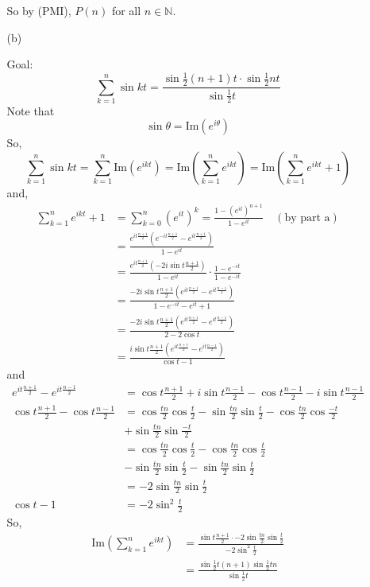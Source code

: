 \documentclass[12pt]{amsart}
\theoremstyle{definition}
\theoremstyle{remark}
\begin{document}
\begin{itemize}
\begin{itemize}
So by (PMI), $P(n)$ for all $n\in \mathbb{N}$.

\vspace{0.1 cm}
\item[(b)] 

Goal: $$\sum_{k=1}^{n}\sin kt=\frac{\sin \frac{1}{2}(n+1)t\cdot\sin\frac{1}{2}nt} {\sin \frac{1}{2}t}$$
Note that
$$\sin \theta=\text{Im}(e^{i\theta})$$
So, $$\sum_{k=1}^{n}\sin kt=\sum_{k=1}^{n}\text{Im}(e^{ikt})=\text{Im}\left(\sum_{k=1}^{n}e^{ikt}\right)=\text{Im}\left(\sum_{k=1}^{n}e^{ikt}+1\right)$$
and, \begin{align*}\sum_{k=1}^{n}e^{ikt}+1&=\sum_{k=0}^{n}(e^{it})^{k}= \frac{1-(e^{it})^{n+1}}{1-e^{it}}\quad(\text{by part a})\\
&=\frac{e^{it\frac{n+1}{2}}\left(e^{-it\frac{n+1}{2}}-e^{it\frac{n+1}{2}}\right)}{1-e^{it}}\\
&= \frac{e^{it\frac{n+1}{2}}\left(-2i\sin t\frac{n+1}{2}\right)}{1-e^{it}}\cdot \frac{1-e^{-it}}{1-e^{-it}}\\
&= \frac{-2i\sin t\frac{n+1}{2}(e^{it\frac{n+1}{2}}-e^{it\frac{n-1}{2}})}{1-e^{-it}-e^{it}+1}\\
&= \frac{-2i\sin t\frac{n+1}{2}(e^{it\frac{n+1}{2}}-e^{it\frac{n-1}{2}})}{2-2\cos t}\\
&= \frac{i\sin t\frac{n+1}{2}\left(e^{it\frac{n+1}{2}}-e^{it\frac{n-1}{2}}\right)}{\cos t-1}
\end{align*}
and \begin{align*}
e^{it\frac{n+1}{2}}-e^{it\frac{n-1}{2}}&= \cos t\frac{n+1}{2}+i\sin t\frac{n-1}{2}-\cos t\frac{n-1}{2}-i\sin t\frac{n-1}{2}\\
\cos t\frac{n+1}{2}-\cos t\frac{n-1}{2}&= \cos \frac{tn}{2}\cos \frac{t}{2}-\sin \frac{tn}{2}\sin \frac{t}{2}-\cos \frac{tn}{2}\cos \frac{-t}{2}\\&+\sin \frac{tn}{2}\sin \frac{-t}{2}\\
&= \cos \frac{tn}{2}\cos \frac{t}{2}-\cos \frac{tn}{2}\cos \frac{t}{2}\\
&-\sin \frac{tn}{2}\sin \frac{t}{2}-\sin \frac{tn}{2}\sin \frac{t}{2}\\
&= -2\sin \frac{tn}{2}\sin \frac{t}{2}\\
\cos t-1&= -2\sin^{2} \frac{t}{2}
\end{align*}
So, \begin{align*}\text{Im}\left(\sum_{k=1}^{n}e^{ikt}\right)&= \frac{\sin t\frac{n+1}{2}\cdot-2\sin \frac{tn}{2}\sin \frac{t}{2}}{-2\sin^{2} \frac{t}{2}}\\
&= \frac{\sin \frac{1}{2}t(n+1)\sin \frac{1}{2}tn}{\sin \frac{1}{2}t}
\end{align*}


\end{itemize}
\end{itemize}
\end{document}
